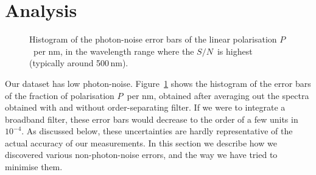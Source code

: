 \documentclass[a4paper]{aa}
\newcommand{\pl}{\ensuremath{P}}
\newcommand{\snr}{\ensuremath{S/N}}
\begin{document}
\section{Analysis}\label{Sect_Analysis}
\begin{figure}
\begin{center}
\end{center}
\caption{\label{Fig_SNR} Histogram of the photon-noise error bars of the linear polarisation
  \pl\ per nm, in the wavelength range where the \snr\ is highest (typically
  around 500\,nm).}
\end{figure}
Our dataset has low
photon-noise. Figure~\ref{Fig_SNR} shows the histogram of the error
bars of the fraction of polarisation \pl\ per nm, obtained after
averaging out the spectra obtained with and without order-separating
filter. If we were to integrate a broadband filter, these error bars would
decrease to the order of a few units in $10^{-4}$. As discussed below,
these uncertainties are hardly representative of the actual accuracy
of our measurements. In this section we describe how we discovered
various non-photon-noise errors, and the way we have tried to minimise
them.
\end{document}
